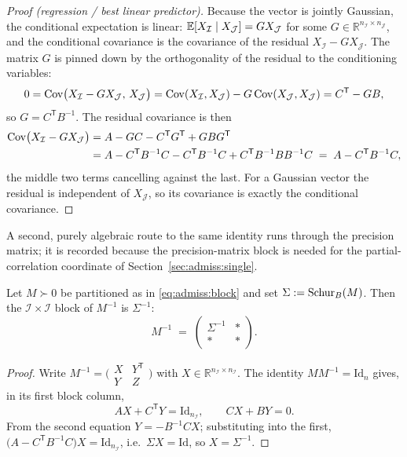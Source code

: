 \begin{proof}[Proof (regression / best linear predictor)]
Because the vector is jointly Gaussian, the conditional expectation is
linear: $\mathbb{E}[X_{\mathcal I} \mid X_{\mathcal J}] = G X_{\mathcal J}$ for some
$G \in \mathbb{R}^{n_{\mathcal I} \times n_{\mathcal J}}$, and the
conditional covariance is the covariance of the residual
$X_{\mathcal I} - G X_{\mathcal J}$. The matrix $G$ is pinned down by the
orthogonality of the residual to the conditioning variables:
\[
  0 = \operatorname{Cov}\bigl(X_{\mathcal I} - G X_{\mathcal J},\, X_{\mathcal J}\bigr)
    = \operatorname{Cov}(X_{\mathcal I}, X_{\mathcal J}) - G \operatorname{Cov}(X_{\mathcal J}, X_{\mathcal J})
    = C^{\mathsf T} - G B,
\]
so $G = C^{\mathsf T} B^{-1}$. The residual covariance is then
\begin{align*}
  \operatorname{Cov}\bigl(X_{\mathcal I} - G X_{\mathcal J}\bigr)
  &= A - G C - C^{\mathsf T} G^{\mathsf T} + G B G^{\mathsf T} \\
  &= A - C^{\mathsf T} B^{-1} C - C^{\mathsf T} B^{-1} C
       + C^{\mathsf T} B^{-1} B B^{-1} C
   \;=\; A - C^{\mathsf T} B^{-1} C,
\end{align*}
the middle two terms cancelling against the last. For a Gaussian vector the
residual is independent of $X_{\mathcal J}$, so its covariance is exactly
the conditional covariance.
\end{proof}

A second, purely algebraic route to the same identity runs through the
precision matrix; it is recorded because the precision-matrix block is
needed for the partial-correlation coordinate of
Section~\ref{sec:admiss:single}.

\begin{proposition}\label{prop:admiss:blockinv}
Let $M \succ 0$ be partitioned as in \eqref{eq:admiss:block} and set
$\Sigma := \mathrm{Schur}_{B}\!\left(M\right)$. Then the $\mathcal I \times \mathcal I$ block of
$M^{-1}$ is $\Sigma^{-1}$:
\[
  M^{-1} \;=\; \begin{pmatrix} \Sigma^{-1} & * \\ * & * \end{pmatrix}.
\]
\end{proposition}

\begin{proof}
Write $M^{-1} = \bigl(\begin{smallmatrix} X & Y^{\mathsf T} \\ Y & Z
\end{smallmatrix}\bigr)$ with $X \in \mathbb{R}^{n_{\mathcal I} \times
n_{\mathcal I}}$. The identity $M M^{-1} = \mathrm{Id}_n$ gives, in its
first block column,
\[
  A X + C^{\mathsf T} Y = \mathrm{Id}_{n_{\mathcal I}},
  \qquad
  C X + B Y = 0 .
\]
From the second equation $Y = -B^{-1} C X$; substituting into the first,
$\bigl(A - C^{\mathsf T} B^{-1} C\bigr) X = \mathrm{Id}_{n_{\mathcal I}}$,
i.e.\ $\Sigma X = \mathrm{Id}$, so $X = \Sigma^{-1}$.
\end{proof}

